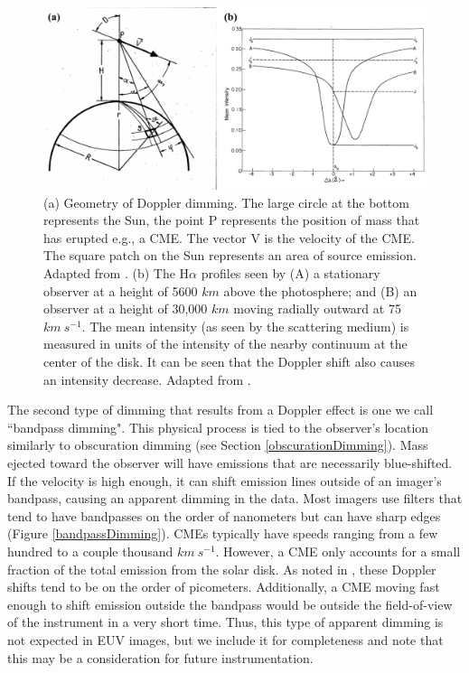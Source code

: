 \begin{figure}[!h]
    \caption[Geometry and effect of Doppler dimming]{
        (a) Geometry of Doppler dimming. The large circle at the bottom represents the Sun, the point P represents the 
        position of mass that has erupted e.g., a CME. The vector V is the velocity of the CME. The square patch on the Sun
        represents an area of source emission. Adapted from \citet{Rompolt1967a}. (b) The H$\alpha$ profiles seen by (A)  a 
        stationary observer at a height of 5600 $km$ above the photosphere; and (B) an observer at a height of 30,000 $km$ 
        moving radially outward at 75 $km\ s^{-1}$. The mean intensity (as seen by the scattering medium) is measured in 
        units of the intensity of the nearby continuum at the center of the disk. It can be seen that the Doppler shift 
        also causes an intensity decrease. Adapted from \citet{Hyder1970}. 
    }
    \begin{center}
        \includegraphics[width=150mm]{Images/DopplerDimming.png}
    \end{center}
    \label{dopplerDimming}
\end{figure}

The second type of dimming that results from a Doppler effect is one we call ``bandpass dimming". This physical process is tied to the observer’s location similarly to obscuration dimming (see Section \ref{obscurationDimming}). Mass ejected toward the observer will have emissions that are necessarily blue-shifted. If the velocity is high enough, it can shift emission lines outside of an imager's bandpass, causing an apparent dimming in the data. Most imagers use filters that tend to have bandpasses on the order of nanometers but can have sharp edges (Figure \ref{bandpassDimming}). CMEs typically have speeds ranging from a few hundred to a couple thousand $km\ s^{-1}$. However, a CME only accounts for a small fraction of the total emission from the solar disk. As noted in \citet{Hudson2011}, these Doppler shifts tend to be on the order of picometers. Additionally, a CME moving fast enough to shift emission outside the bandpass would be outside the field-of-view of the instrument in a very short time. Thus, this type of apparent dimming is not expected in EUV images, but we include it for completeness and note that this may be a consideration for future instrumentation. 

